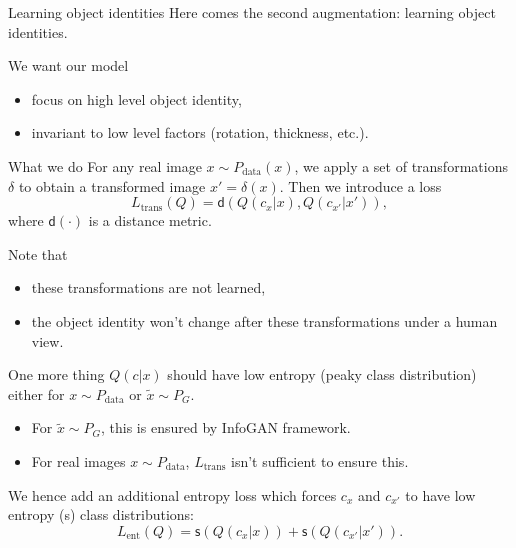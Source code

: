 \documentclass[xcolor={svgnames}]{beamer}
\begin{document}

\begin{frame}{Learning object identities}
  Here comes the second augmentation: \alert{learning object identities}. 

  We want our model
  \begin{itemize}
    \item focus on high level object identity,
    \item invariant to low level factors (rotation, thickness, etc.).
  \end{itemize}
\end{frame}


\begin{frame}{What we do}
  For any real image $x \sim P_{\text{data}}(x)$, we apply a set of
  transformations $\delta$ to obtain a transformed image $x' = \delta(x)$.
  Then we introduce a loss
  \[
    L_{\text{trans}}(Q) = \mathsf{d}(Q(c_x | x), Q(c_{x'} | x')),
  \]
  where $\mathsf{d}(\cdot)$ is a distance metric.

  Note that
  \begin{itemize}
    \item these transformations are not learned,
    \item the object identity won't change after these transformations under
      a human view.
  \end{itemize}
\end{frame}


\begin{frame}{One more thing}
  $Q(c|x)$ should have low entropy (peaky class distribution) either for
  $x \sim P_{\text{data}}$ or $\tilde{x} \sim P_G$.

  \begin{itemize}
    \item For $\tilde{x} \sim P_G$, this is ensured by InfoGAN framework.
    \item For real images $x \sim P_{\text{data}}$, $L_{\text{trans}}$ isn't
      sufficient to ensure this.
  \end{itemize}
  We hence add an additional entropy loss which forces $c_x$ and $c_{x'}$ to 
  have low entropy (s) class distributions:
  \[
    L_{\text{ent}}(Q) = \mathsf{s}(Q(c_x | x)) + \mathsf{s}(Q(c_{x'} | x')).
  \]
\end{frame}
\end{document}
